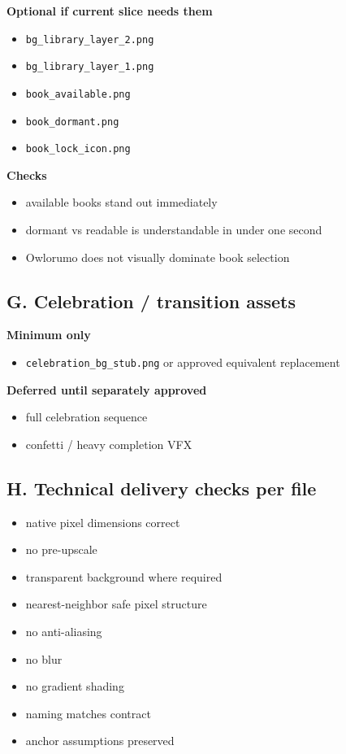 \documentclass[11pt,a4paper]{article}
\newcommand{\checkbox}{\ensuremath{\square}}
\begin{document}
\textbf{Optional if current slice needs them}
\begin{itemize}
  \item[\checkbox] \texttt{bg\_library\_layer\_2.png}
  \item[\checkbox] \texttt{bg\_library\_layer\_1.png}
  \item[\checkbox] \texttt{book\_available.png}
  \item[\checkbox] \texttt{book\_dormant.png}
  \item[\checkbox] \texttt{book\_lock\_icon.png}
\end{itemize}

\textbf{Checks}
\begin{itemize}
  \item[\checkbox] available books stand out immediately
  \item[\checkbox] dormant vs readable is understandable in under one second
  \item[\checkbox] Owlorumo does not visually dominate book selection
\end{itemize}

\subsection*{G. Celebration / transition assets}
\textbf{Minimum only}
\begin{itemize}
  \item[\checkbox] \texttt{celebration\_bg\_stub.png} or approved equivalent replacement
\end{itemize}

\textbf{Deferred until separately approved}
\begin{itemize}
  \item[\checkbox] full celebration sequence
  \item[\checkbox] confetti / heavy completion VFX
\end{itemize}

\subsection*{H. Technical delivery checks per file}
\begin{itemize}
  \item[\checkbox] native pixel dimensions correct
  \item[\checkbox] no pre-upscale
  \item[\checkbox] transparent background where required
  \item[\checkbox] nearest-neighbor safe pixel structure
  \item[\checkbox] no anti-aliasing
  \item[\checkbox] no blur
  \item[\checkbox] no gradient shading
  \item[\checkbox] naming matches contract
  \item[\checkbox] anchor assumptions preserved
\end{itemize}
\end{document}
